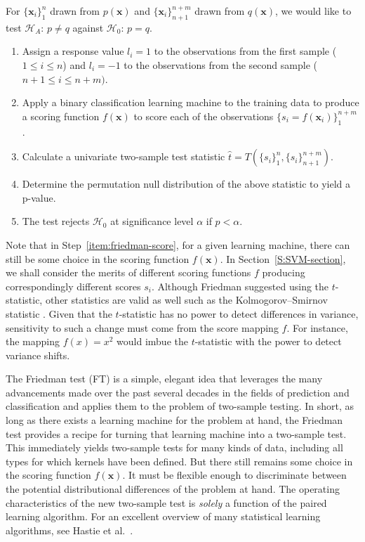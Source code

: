 For $\{\mathbf{x}_i\}_1^n$ drawn from $p(\mathbf{x})$ and
$\{\mathbf{x}_i\}_{n+1}^{n+m}$ drawn from $q(\mathbf{x})$, we would like to
test $\mathcal{H}_A$: $p \neq q$ against $\mathcal{H}_0$: $p = q$.
\begin{enumerate}
\item Assign a response value $l_i = 1$ to the observations from the
  first sample ($1 \leq i \leq n$) and $l_i = -1$ to the observations
  from the second sample ($n + 1 \leq i \leq n+m)$.
\item Apply a binary classification learning machine to the training
  data to produce a scoring function $f(\mathbf{x})$ to score each of
  the observations $\{s_i = f(\mathbf{x}_i)\}_1^{n+m}$. \label{item:friedman-score}
\item Calculate a univariate two-sample test statistic $\hat{t} =
  T(\{s_i\}_1^n,\{s_i\}_{n+1}^{n+m})$.
\item Determine the permutation null distribution of the above
  statistic to yield a p-value.
\item The test rejects $\mathcal{H}_0$ at significance level $\alpha$
  if $p < \alpha$.
\end{enumerate}

Note that in Step~\ref{item:friedman-score}, for a given learning
machine, there can still be some choice in the scoring function
$f(\mathbf{x})$.  In Section~\ref{S:SVM-section}, we shall consider
the merits of different scoring functions $f$ producing
correspondingly different scores $s_i$.  Although Friedman suggested
using the $t$-statistic, other statistics are valid as well such as
the Kolmogorov--Smirnov statistic \cite{KolmogorovAN1933, MR0025109}.
Given that the $t$-statistic has no power to detect differences in
variance, sensitivity to such a change must come from the score
mapping $f$.  For instance, the mapping $f(x) = x^2$ would imbue the
$t$-statistic with the power to detect variance shifts.

The Friedman test (FT) is a simple, elegant idea that leverages the
many advancements made over the past several decades in the fields of
prediction and classification and applies them to the problem of
two-sample testing.  In short, as long as there exists a learning
machine for the problem at hand, the Friedman test provides a recipe
for turning that learning machine into a two-sample test.  This
immediately yields two-sample tests for many kinds of data, including
all types for which kernels have been defined.
But there still remains some choice in the scoring
function $f(\mathbf{x})$.  It must be flexible enough to discriminate
between the potential distributional differences of the problem at
hand.  The operating characteristics of the new two-sample test is
\emph{solely} a function of the paired learning algorithm.  For an
excellent overview of many statistical learning algorithms, see
Hastie et al.\ \cite{hastie2009elements}.

